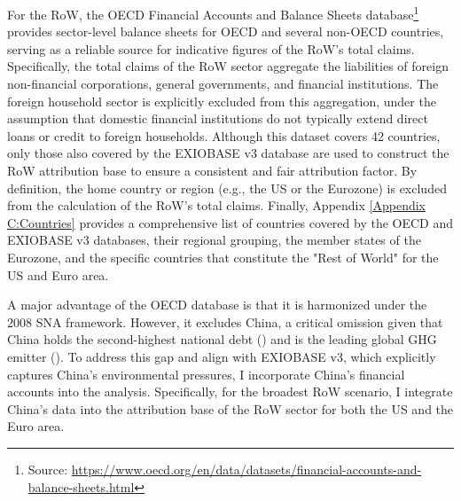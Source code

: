 For the RoW, the OECD Financial Accounts and Balance Sheets database\footnote{Source: \url{https://www.oecd.org/en/data/datasets/financial-accounts-and-balance-sheets.html}} provides sector-level balance sheets for OECD and several non-OECD countries, serving as a reliable source for indicative figures of the RoW's total claims. Specifically, the total claims of the RoW sector aggregate the liabilities of foreign non-financial corporations, general governments, and financial institutions. The foreign household sector is explicitly excluded from this aggregation, under the assumption that domestic financial institutions do not typically extend direct loans or credit to foreign households. Although this dataset covers 42 countries, only those also covered by the EXIOBASE v3 database are used to construct the RoW attribution base to ensure a consistent and fair attribution factor. By definition, the home country or region (e.g., the US or the Eurozone) is excluded from the calculation of the RoW's total claims. Finally, Appendix \ref{Appendix C:Countries} provides a comprehensive list of countries covered by the OECD and EXIOBASE v3 databases, their regional grouping, the member states of the Eurozone, and the specific countries that constitute the "Rest of World" for the US and Euro area. 

A major advantage of the OECD database is that it is harmonized under the 2008 SNA framework. However, it excludes China, a critical omission given that China holds the second-highest national debt (\cite{world_population_review_countries_2026}) and is the leading global GHG emitter (\cite{european_commission_joint_research_centre_ghg_2025}). To address this gap and align with EXIOBASE v3, which explicitly captures China’s environmental pressures, I incorporate China's financial accounts into the analysis. Specifically, for the broadest RoW scenario, I integrate China's data into the attribution base of the RoW sector for both the US and the Euro area.

